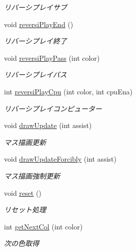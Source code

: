 \begin{DoxyCompactItemize}
\begin{DoxyCompactList}\small\item\em リバーシプレイサブ \end{DoxyCompactList}\item 
void \hyperlink{class_reversi4color_form_1_1_reversi_play_a79053272ed2b985de79154b105c46c15}{reversi\+Play\+End} ()
\begin{DoxyCompactList}\small\item\em リバーシプレイ終了 \end{DoxyCompactList}\item 
void \hyperlink{class_reversi4color_form_1_1_reversi_play_a47c3f277e5f480d6a5af1ca7b3a667f4}{reversi\+Play\+Pass} (int color)
\begin{DoxyCompactList}\small\item\em リバーシプレイパス \end{DoxyCompactList}\item 
int \hyperlink{class_reversi4color_form_1_1_reversi_play_a0fdeec03a631927d44ed2602808b8619}{reversi\+Play\+Cpu} (int color, int cpu\+Ena)
\begin{DoxyCompactList}\small\item\em リバーシプレイコンピューター \end{DoxyCompactList}\item 
void \hyperlink{class_reversi4color_form_1_1_reversi_play_a61428c9797c95359b397564d0bcfa7e7}{draw\+Update} (int assist)
\begin{DoxyCompactList}\small\item\em マス描画更新 \end{DoxyCompactList}\item 
void \hyperlink{class_reversi4color_form_1_1_reversi_play_a0ef55faf321fa98d44baad4f25ae6940}{draw\+Update\+Forcibly} (int assist)
\begin{DoxyCompactList}\small\item\em マス描画強制更新 \end{DoxyCompactList}\item 
void \hyperlink{class_reversi4color_form_1_1_reversi_play_a32c01f1f57a7413cd5173637800f74b7}{reset} ()
\begin{DoxyCompactList}\small\item\em リセット処理 \end{DoxyCompactList}\item 
int \hyperlink{class_reversi4color_form_1_1_reversi_play_a037f282ad4aeb2807a0108cbbb82fd02}{get\+Next\+Col} (int color)
\begin{DoxyCompactList}\small\item\em 次の色取得 \end{DoxyCompactList}\item 

\end{DoxyCompactItemize}
